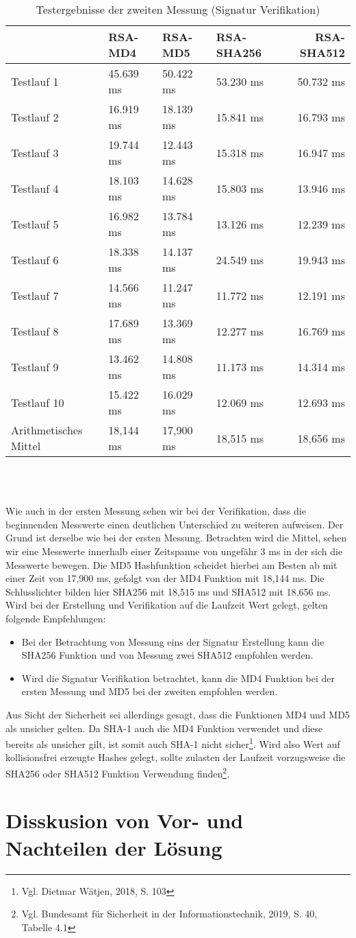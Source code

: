\begin{table}[h]
	\begin{tabularx}{\textwidth}{p{}|X|X|X|r}
		& RSA-MD4 & RSA-MD5 & RSA-SHA256 & RSA-SHA512\\
		\hline
		Testlauf 1& 45.639 ms& 50.422 ms& 53.230 ms& 50.732 ms\\
		Testlauf 2& 16.919 ms& 18.139 ms& 15.841 ms& 16.793 ms\\
		Testlauf 3& 19.744 ms& 12.443 ms& 15.318 ms& 16.947 ms\\
		Testlauf 4& 18.103 ms& 14.628 ms& 15.803 ms& 13.946 ms\\
		Testlauf 5& 16.982 ms& 13.784 ms& 13.126 ms& 12.239 ms\\
		Testlauf 6& 18.338 ms& 14.137 ms& 24.549 ms& 19.943 ms\\
		Testlauf 7& 14.566 ms& 11.247 ms& 11.772 ms& 12.191 ms\\
		Testlauf 8& 17.689 ms& 13.369 ms& 12.277 ms& 16.769 ms\\
		Testlauf 9& 13.462 ms& 14.808 ms& 11.173 ms& 14.314 ms\\
		Testlauf 10& 15.422 ms& 16.029 ms& 12.069 ms& 12.693 ms\\
		\hline
		Arithmetisches Mittel& 18,144 ms& 17,900 ms& 18,515 ms& 18,656 ms\\
	\end{tabularx}\\
	\caption{Testergebnisse der zweiten Messung (Signatur Verifikation)}
\end{table}\\
Wie auch in der ersten Messung sehen wir bei der Verifikation, dass die beginnenden Messwerte einen deutlichen Unterschied zu weiteren aufweisen. Der Grund ist derselbe wie bei der ersten Messung. Betrachten wird die Mittel, sehen wir eine Messwerte innerhalb einer Zeitspanne von ungefähr 3 ms in der sich die Messwerte bewegen. Die MD5 Hashfunktion scheidet hierbei am Besten ab mit einer Zeit von 17,900 ms, gefolgt von der MD4 Funktion mit 18,144 ms. Die Schlusslichter bilden hier SHA256 mit 18,515 ms und SHA512 mit 18,656 ms.\\

Wird bei der Erstellung und Verifikation auf die Laufzeit Wert gelegt, gelten folgende Empfehlungen:
\begin{itemize}
	\item Bei der Betrachtung von Messung eins der Signatur Erstellung kann die SHA256 Funktion und von Messung zwei SHA512 empfohlen werden.
	\item Wird die Signatur Verifikation betrachtet, kann die MD4 Funktion bei der ersten Messung und MD5 bei der zweiten empfohlen werden.
\end{itemize}
Aus Sicht der Sicherheit sei allerdings gesagt, dass die Funktionen MD4 und MD5 als unsicher gelten. Da SHA-1 auch die MD4 Funktion verwendet und diese bereits als unsicher gilt, ist somit auch SHA-1 nicht sicher\footnote{Vgl. Dietmar Wätjen, 2018, S. 103}. Wird also Wert auf kollisionsfrei erzeugte Hashes gelegt, sollte zulasten der Laufzeit vorzugsweise die SHA256 oder SHA512 Funktion Verwendung finden\footnote{Vgl. Bundesamt für Sicherheit in der Informationstechnik, 2019, S. 40, Tabelle 4.1}.\\
\section{Disskusion von Vor- und Nachteilen der Lösung}
